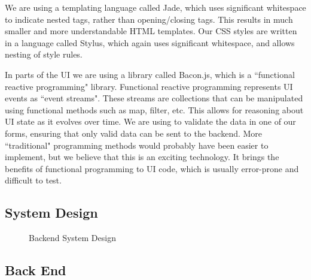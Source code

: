 \documentclass[11pt]{article}
\begin{document}
We are using a templating language called Jade, which uses significant whitespace to indicate nested tags, rather than opening/closing tags. This results in much smaller and more understandable HTML templates. Our CSS styles are written in a language called Stylus, which again uses significant whitespace, and allows nesting of style rules.

In parts of the UI we are using a library called Bacon.js, which is a ``functional reactive programming" library. Functional reactive programming represents UI events as ``event streams". These streams are collections that can be manipulated using functional methods such as map, filter, etc. This allows for reasoning about UI state as it evolves over time. We are using to validate the data in one of our forms, ensuring that only valid data can be sent to the backend. More ``traditional" programming methods would probably have been easier to implement, but we believe that this is an exciting technology. It brings the benefits of functional programming to UI code, which is usually error-prone and difficult to test.

\subsection {System Design}

\begin{figure}[H]
\centering
{}
\caption{\label{fig:backend-diagram} Backend System Design}
\end{figure}

\subsection {Back End}
\end{document}
